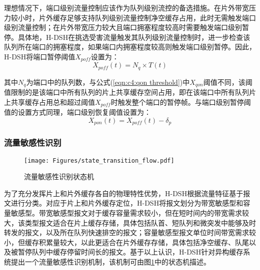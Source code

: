 
理想情况下，端口级别流量控制应该作为队列级别流控的备选措施。在片外带宽压力较小时，片外缓存足够支持队列级别流量控制净空缓存占用，此时无需触发端口级别流量控制；在片外带宽压力较大且端口拥塞程度较高时需要触发端口级别暂停。具体地，H-DSH在挑选受害流量触发其队列级别流量控制时，进一步检查该队列所在端口的拥塞程度，如果端口内拥塞程度较高则触发端口级别暂停。因此，H-DSH将端口暂停阈值$X_{\mathit{poff}}$设置为：
\begin{equation}
  X_{\mathit{poff}}(t) = N_q \times T(t)
  \label{eqn:c4:poff threshold}
\end{equation}

\noindent 其中$N_q$为端口中的队列数，与公式(\ref{eqn:c4:qon threshold})中$X_{qon}$阈值不同，该阈值限制的是该端口中所有队列的片上共享缓存空间占用，即在该端口中所有队列片上共享缓存占用总和超过阈值$X_{\mathit{poff}}$时触发整个端口的暂停帧。与端口级别暂停阈值的设置方式同理，端口级别恢复阈值设置为：
\begin{equation}
  X_{pon}(t) = X_{\mathit{poff}}(t) - \delta_p
  \label{eqn:c4:pon threshold}
\end{equation}


\subsubsection{流量敏感性识别}

\begin{figure}[H]
  \centering
  \texttt{[image: Figures/state\_transition\_flow.pdf]}
  \caption{流量敏感性识别状态机}
  \label{c4:s1:ss1:fig:flow state transition}
\end{figure}

为了充分发挥片上和片外缓存各自的物理特性优势，H-DSH根据流量特征基于报文进行分类。对应于片上和片外缓存定位，H-DSH将报文划分为带宽敏感型和容量敏感型。带宽敏感型报文对于缓存容量需求较小，但在短时间内的带宽需求较大，该类型报文适合在片上缓存存储，具体包括队首、短队列和微突发中能够及时转发的报文，以及所在队列快速排空的报文；容量敏感型报文单位时间带宽需求较小，但缓存积累量较大，以此更适合在片外缓存存储，具体包括净空缓存、队尾以及被暂停队列中缓存停留时间长的报文。基于以上认识，H-DSH针对异构缓存系统提出一个流量敏感性识别机制，该机制可由图\ref{c4:s1:ss1:fig:flow state transition}中的状态机描述。

